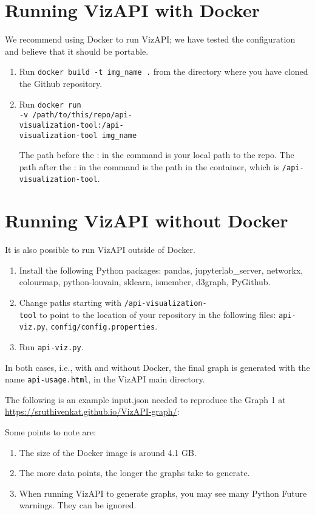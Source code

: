 \documentclass[conference]{IEEEtran}
\begin{document}
\section{Running VizAPI with Docker}
We recommend using Docker to run VizAPI; we have tested the configuration and believe that it should be portable.
\begin{enumerate}
\item Run \texttt{docker build -t img\_name .} 
from the directory where you have cloned the Github repository.
\item Run \texttt{docker run \\\hspace*{1em} -v /path/to/this/repo/api-\\\hspace*{1em} visualization-tool:/api-\\ \hspace*{1em} visualization-tool img\_name} 

The path before the : in the command is your local path to the repo. The path after the : in the command is the path in the container, which is \texttt{/api-visualization-tool}.
\end{enumerate}

\section{Running VizAPI without Docker}
It is also possible to run VizAPI outside of Docker.
\begin{enumerate}
\item Install the following Python packages: pandas, jupyterlab\_server, networkx, colourmap, python-louvain, sklearn, ismember, d3graph, PyGithub.
\item Change paths starting with \texttt{/api-visualization-\\tool} to point to the location of your repository in the following files: \texttt{api-viz.py}, \texttt{config/config.properties}.
\item Run \texttt{api-viz.py}.
\end{enumerate}

In both cases, i.e., with and without Docker, the final graph is generated with the name \texttt{api-usage.html}, in the VizAPI 
main directory.

The following is an example input.json needed to reproduce the Graph 1 at \href{https://sruthivenkat.github.io/VizAPI-graph/}{https://sruthivenkat.github.io/VizAPI-graph/}:


Some points to note are:
\begin{enumerate}
\item The size of the Docker image is around 4.1 GB.
\item The more data points, the longer the graphs take to generate.
\item When running VizAPI to generate graphs, you may see many Python Future warnings. They can be ignored.
\end{enumerate}
\end{document}
